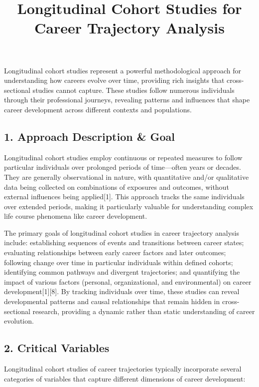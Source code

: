 \documentclass[
  letterpaper,
  DIV=11,
  numbers=noendperiod]{scrartcl}
\title{Longitudinal Cohort Studies for Career Trajectory Analysis}
\author{}
\date{}
\begin{document}
\maketitle


Longitudinal cohort studies represent a powerful methodological approach
for understanding how careers evolve over time, providing rich insights
that cross-sectional studies cannot capture. These studies follow
numerous individuals through their professional journeys, revealing
patterns and influences that shape career development across different
contexts and populations.

\subsection{1. Approach Description \&
Goal}\label{approach-description-goal}

Longitudinal cohort studies employ continuous or repeated measures to
follow particular individuals over prolonged periods of time---often
years or decades. They are generally observational in nature, with
quantitative and/or qualitative data being collected on combinations of
exposures and outcomes, without external influences being
applied{[}1{]}. This approach tracks the same individuals over extended
periods, making it particularly valuable for understanding complex life
course phenomena like career development.

The primary goals of longitudinal cohort studies in career trajectory
analysis include: establishing sequences of events and transitions
between career states; evaluating relationships between early career
factors and later outcomes; following change over time in particular
individuals within defined cohorts; identifying common pathways and
divergent trajectories; and quantifying the impact of various factors
(personal, organizational, and environmental) on career
development{[}1{]}{[}8{]}. By tracking individuals over time, these
studies can reveal developmental patterns and causal relationships that
remain hidden in cross-sectional research, providing a dynamic rather
than static understanding of career evolution.

\subsection{2. Critical Variables}\label{critical-variables}

Longitudinal cohort studies of career trajectories typically incorporate
several categories of variables that capture different dimensions of
career development:
\end{document}
